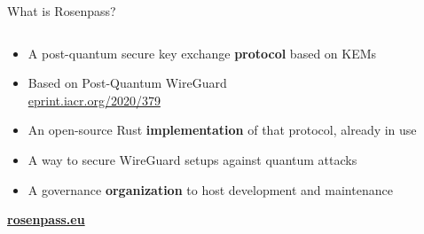 \begin{frame}{What is Rosenpass?}
  \begin{columns}[fullwidth,c]
    \begin{column}{.5\linewidth}
      \begin{itemize}
        \item A post-quantum secure key exchange \textbf{protocol} based on KEMs
        \item Based on Post-Quantum WireGuard\\
              {\small \href{https://eprint.iacr.org/2020/379}{eprint.iacr.org/2020/379}}
        \item An open-source Rust \textbf{implementation} of that protocol, already in use
        \item A way to secure WireGuard setups against quantum attacks %
        \item A governance \textbf{organization} to host development and maintenance
      \end{itemize}
      \vspace{2em}
      \textbf{\href{https://rosenpass.eu}{rosenpass.eu}}
    \end{column}%

  \end{columns}
\end{frame}

